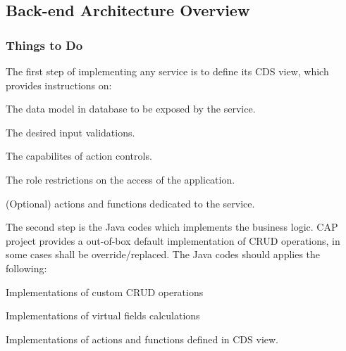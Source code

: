 \subsection{Back-end Architecture Overview}

\subsubsection{Things to Do}
The first step of implementing any service is to define its CDS view, which provides instructions on:
\begin{compactenum}
	\item The data model in database to be exposed by the service.
	\item The desired input validations.
	\item The capabilites of action controls.
    \item The role restrictions on the access of the application.
    \item (Optional) actions and functions dedicated to the service.
\end{compactenum}

\bigskip

The second step is the Java codes which implements the business logic. CAP project provides a out-of-box default implementation of CRUD operations, in some cases shall be override/replaced. The Java codes should applies the following:
\begin{compactenum}
	\item Implementations of custom CRUD operations
	\item Implementations of virtual fields calculations
	\item Implementations of actions and functions defined in CDS view.
\end{compactenum}

